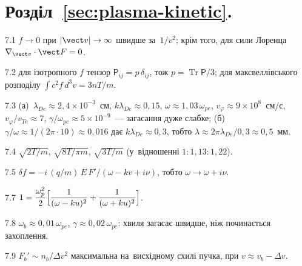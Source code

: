\protect \section *{Розділ~\ref *{sec:plasma-kinetic}. }
\begin{Solution}{7.{1}}
		$f\to0$ при $|\vect v|\to\infty$ швидше за~$1/v^2$; крім того, для сили Лоренца $\nabla_{\vect v}\cdot\vect F=0$.
	
\end{Solution}
\begin{Solution}{7.{2}}
		для ізотропного $f$ тензор $\mathsf P_{ij}=p\,\delta_{ij}$, тож $p=\operatorname{Tr}\mathsf P/3$; для максвеллівського розподілу $\int c^2f\,d^3v=3nT/m$.
	
\end{Solution}
\begin{Solution}{7.{3}}
		(а)~$\lambda_{De}\approx2{,}4\times10^{-3}$~см, $k\lambda_{De}\approx0{,}15$, $\omega\approx1{,}03\,\omega_{pe}$,
$v_\varphi\approx9\times10^8$~см/с, $v_\varphi/v_{Te}\approx7$, $\gamma/\omega_{pe}\approx5\times10^{-9}$~--- загасання дуже слабке;
(б)~$\gamma/\omega\approx1/(2\pi\cdot10)\approx0{,}016$ дає $k\lambda_{De}\approx0{,}3$, тобто $\lambda\approx2\pi\lambda_{De}/0{,}3\approx0{,}5$~мм.
	
\end{Solution}
\begin{Solution}{7.{4}}
		$\sqrt{2T/m}$, $\sqrt{8T/\pi m}$, $\sqrt{3T/m}$
(у~відношенні $1:1{,}13:1{,}22$).
	
\end{Solution}
\begin{Solution}{7.{5}}
		$\delta f=-i\,(q/m)\,E\,F'/(\omega-kv+i\nu)$, тобто $\omega\to\omega+i\nu$.
	
\end{Solution}
\begin{Solution}{7.{7}}
		$1=\dfrac{\omega_p^2}2\Bigl[\dfrac1{(\omega-ku)^2}+\dfrac1{(\omega+ku)^2}\Bigr]$.
	
\end{Solution}
\begin{Solution}{7.{8}}
		$\omega_b\approx0{,}01\,\omega_{pe}$, $\gamma\approx0{,}02\,\omega_{pe}$: хвиля загасає швидше, ніж
починається захоплення.
	
\end{Solution}
\begin{Solution}{7.{9}}
		$F_b'\sim n_b/\Delta v^2$ максимальна на~висхідному схилі пучка, при $v\approx v_b-\Delta v$.
	
\end{Solution}
